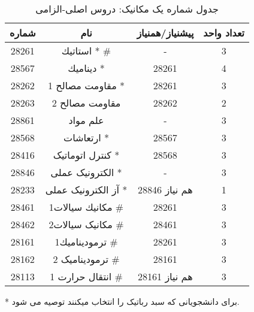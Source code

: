 \documentclass[class=article, crop=false]{standalone}
\begin{document}
	\begin{table}[H]
\begin{center}
\begin{tabular}{|c|c|c|c|}
	\hline
	شماره & نام & پیشنیاز/همنیاز & تعداد واحد \\
	\hline
	28261 & استاتيك * \# & - & 3 \\
	\hline
	28567 & ديناميك * & 28261  & 4 \\
	\hline
	28262 & مقاومت مصالح 1 * & 28261 & 3 \\
	\hline
	28263 & مقاومت مصالح 2 & 28262 & 2 \\
	\hline
	28861 & علم مواد     & - & 3 \\
	\hline
	28568 & ارتعاشات * & 28567  & 3 \\
	\hline
	28416 & کنترل اتوماتیک * & 28568 & 3 \\
	\hline
	28846 & الکترونیک عملی * & - & 3 \\
	\hline
	28233 & آز الکترونیک عملی * & 28846 هم نیاز & 1 \\
	\hline
	28461 & مكانيك سيالات1 \# & 28261 & 3 \\
	\hline
	28462 & مکانیک سیالات2  \# & 28461  & 3 \\
	\hline
	28161 & ترموديناميك1 \# & 28261 & 3 \\
	\hline
	28162 & ترمودینامیک 2 \# & 28161 & 3 \\
	\hline
	28113 & انتقال حرارت 1 \# & 28161 هم نیاز & 3 \\
	\hline
\end{tabular}
\caption{\label{mech-t1}
جدول شماره یک مکانیک: دروس اصلی-الزامی
}
\end{center}
	\end{table}
* برای دانشجویانی که سبد رباتیک را انتخاب میکنند توصیه می شود.
\end{document}
